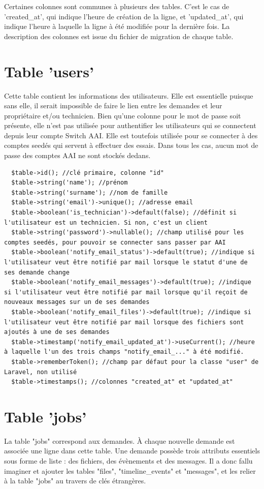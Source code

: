 \documentclass[
    iai, %
    eai, %
]{heig-tb}
\begin{document}
Certaines colonnes sont communes à plusieurs des tables. C'est le cas de 'created\_at', qui indique l'heure de création de la ligne, et 'updated\_at', qui indique l'heure à laquelle la ligne à été modifiée pour la dernière fois. La description des colonnes est issue du fichier de migration de chaque table.

\section{Table 'users'}
Cette table contient les informations des utilisateurs. Elle est essentielle puisque sans elle, il serait impossible de faire le lien entre les demandes et leur propriétaire et/ou technicien.
Bien qu'une colonne pour le mot de passe soit présente, elle n'est pas utilisée pour authentifier les utilisateurs qui se connectent depuis leur compte Switch AAI. Elle est toutefois utilisée pour se connecter à des comptes seedés qui servent à effectuer des essais. Dans tous les cas, aucun mot de passe des comptes AAI ne sont stockés dedans.

\begin{verbatim}
  $table->id(); //clé primaire, colonne "id"
  $table->string('name'); //prénom
  $table->string('surname'); //nom de famille
  $table->string('email')->unique(); //adresse email
  $table->boolean('is_technician')->default(false); //définit si l'utilisateur est un technicien. Si non, c'est un client
  $table->string('password')->nullable(); //champ utilisé pour les comptes seedés, pour pouvoir se connecter sans passer par AAI
  $table->boolean('notify_email_status')->default(true); //indique si l'utilisateur veut être notifié par mail lorsque le statut d'une de ses demande change
  $table->boolean('notify_email_messages')->default(true); //indique si l'utilisateur veut être notifié par mail lorsque qu'il reçoit de nouveaux messages sur un de ses demandes
  $table->boolean('notify_email_files')->default(true); //indique si l'utilisateur veut être notifié par mail lorsque des fichiers sont ajoutés à une de ses demandes
  $table->timestamp('notify_email_updated_at')->useCurrent(); //heure à laquelle l'un des trois champs "notify_email_..." à été modifié.
  $table->rememberToken(); //champ par défaut pour la classe "user" de Laravel, non utilisé
  $table->timestamps(); //colonnes "created_at" et "updated_at"
\end{verbatim}

\section{Table 'jobs'}
La table "jobs" correspond aux demandes. À chaque nouvelle demande est associée une ligne dans cette table. Une demande possède trois attributs essentiels sous forme de liste : des fichiers, des évènements et des messages. Il a donc fallu imaginer et ajouter les tables "files", "timeline\_events" et "messages", et les relier à la table "jobs" au travers de clés étrangères.
\end{document}
